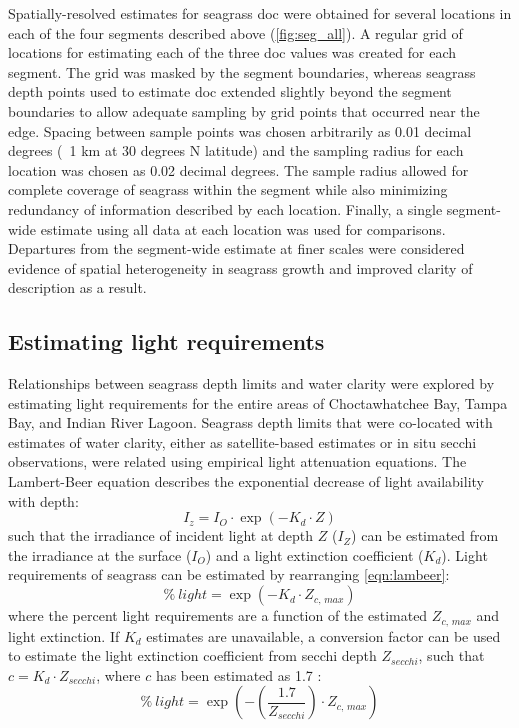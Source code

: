 \documentclass[letterpaper,12pt,oneside]{article}\usepackage[]{graphicx}\usepackage[]{color}
\begin{document}
Spatially-resolved estimates for seagrass \ac{doc} were obtained for several locations in each of the four segments described above (\cref{fig:seg_all}).  A regular grid of locations for estimating each of the three \ac{doc} values was created for each segment.  The grid was masked by the segment boundaries, whereas seagrass depth points used to estimate \ac{doc} extended slightly beyond the segment boundaries to allow adequate sampling by grid points that occurred near the edge.  Spacing between sample points was chosen arbitrarily as 0.01 decimal degrees (~1 km at 30 degrees N latitude) and the sampling radius for each location was chosen as 0.02 decimal degrees.  The sample radius allowed for complete coverage of seagrass within the segment while also minimizing redundancy of information described by each location.  Finally, a single segment-wide estimate using all data at each location was used for comparisons.  Departures from the segment-wide estimate at finer scales were considered evidence of spatial heterogeneity in seagrass growth and improved clarity of description as a result.  

\subsection{Estimating light requirements}

Relationships between seagrass depth limits and water clarity were explored by estimating light requirements for the entire areas of Choctawhatchee Bay, Tampa Bay, and Indian River Lagoon.  Seagrass depth limits that were co-located with estimates of water clarity, either as satellite-based estimates or in situ secchi observations, were related using empirical light attenuation equations.  The Lambert-Beer equation describes the exponential decrease of light availability with depth:
\begin{equation} \label{eqn:lambeer}
I_{z} = I_{O} \cdot \exp\left(-K_{d} \cdot Z\right)
\end{equation}
\noindent such that the irradiance of incident light at depth $Z$ ($I_{Z}$) can be estimated from the irradiance at the surface ($I_{O}$) and a light extinction coefficient ($K_{d}$). Light requirements of seagrass can be estimated by rearranging \cref{eqn:lambeer}:
\begin{equation} \label{eqn:perclight}
\% \ light = \exp\left(-K_{d} \cdot Z_{c,\,max}\right)
\end{equation}
\noindent where the percent light requirements are a function of the estimated $Z_{c,\,max}$ and light extinction. If $K_d$ estimates are unavailable, a conversion factor can be used to estimate the light extinction coefficient from secchi depth $Z_{secchi}$, such that $c = K_{d} \cdot Z_{secchi}$, where $c$ has been estimated as 1.7 \citep{Poole29,Idso74}:
\begin{equation} \label{eqn:cperclight}
\% \ light = \exp\left(-\left(\frac{1.7}{Z_{secchi}}\right)\cdot Z_{c,\,max}\right)
\end{equation}
\end{document}
